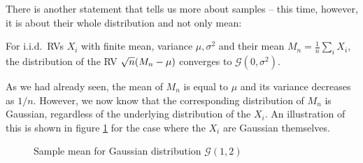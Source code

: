 There is another statement that tells us more about samples -- this time, however, it is about their whole distribution and not only mean:
\begin{prop}
For i.i.d.~RVs $X_i$ with finite mean, variance $\mu, \sigma^2$ and their mean $M_n = \frac{1}{n} \sum_i X_i$, the distribution of the RV $\sqrt{n} \qty(M_n - \mu)$ converges to $\mathcal{G}(0, \sigma^2)$.\footnotemark
\end{prop}
As we had already seen, the mean of $M_n$ is equal to $\mu$ and its variance decreases as $1 / n$. However, we now know that the corresponding distribution of $M_n$ is Gaussian, regardless of the underlying distribution of the $X_i$. An illustration of this is shown in figure \ref{fig:central_limit} for the case where the $X_i$ are Gaussian themselves.




\begin{figure}
\centering

%
\hspace{0.04\textwidth}%
%

\caption{Sample mean for Gaussian distribution $\mathcal{G}(1, 2)$}
\label{fig:central_limit}
\end{figure}




